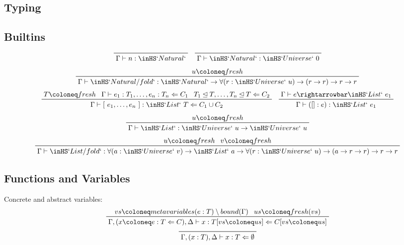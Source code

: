 \documentclass[11pt, twoside, reqno]{book}
\newcommand{\subsumedBy}{\unlhd}
\begin{document}
\begin{appdices}
\section{Typing}

\subsection{Builtins}
\begin{displaymath}
\prftree{\Gamma \vdash n : \inHS`Natural`}
\quad
\prftree{\Gamma \vdash \inHS`Natural` : \inHS`Universe`\ 0}
\end{displaymath}
\begin{displaymath}
\prftree{u \coloneq fresh}{\Gamma \vdash \inHS`Natural/fold` : \inHS`Natural` \to
\forall(r : \inHS`Universe`\ u) \to
(r \to r) \to r \to r}
\end{displaymath}
\begin{displaymath}
\prftree{T \coloneq fresh}{\Gamma \vdash e_1 : T_1, \dots, e_n : T_n \Leftarrow C_1}{T_1 \subsumedBy T, \dots, T_n \subsumedBy T \Leftarrow C_2}{\Gamma \vdash [\ e_1, \dots, e_n\ ] : \inHS`List`\ T \Leftarrow C_1 \cup C_2}
\quad
\prftree{\Gamma \vdash e \rightarrowbar \inHS`List`\ e_1}{\Gamma \vdash ([] : e) : \inHS`List`\ e_1}
\end{displaymath}
\begin{displaymath}
\prftree{u \coloneq fresh}{\Gamma \vdash \inHS`List` : \inHS`Universe`\ u \to \inHS`Universe`\ u}
\end{displaymath}
\begin{displaymath}
\prftree{u \coloneq fresh}{v \coloneq fresh}{\Gamma \vdash \inHS`List/fold` : \forall(a : \inHS`Universe`\ v) \to \inHS`List`\ a \to
\forall(r : \inHS`Universe`\ u) \to
(a \to r \to r) \to r \to r}
\end{displaymath}

\subsection{Functions and Variables}
Concrete and abstract variables:
\begin{displaymath}
\prftree{vs \coloneq metavariables(e : T) \setminus bound(\Gamma)}{us \coloneq fresh(vs)}{\Gamma, (x \coloneq e : T \Leftarrow C), \Delta \vdash x : T[vs \coloneq us] \Leftarrow C[vs \coloneq us]}
\end{displaymath}
\begin{displaymath}
\prftree{\Gamma, (x : T), \Delta \vdash x : T \Leftarrow \emptyset}
\end{displaymath}


\end{appdices}
\end{document}
